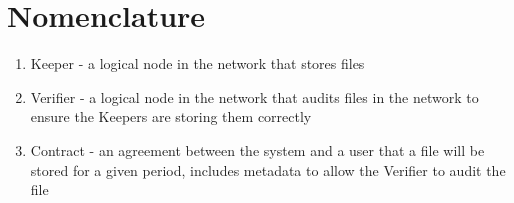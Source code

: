 \chapter{Nomenclature}
\label{chap:nomenclature}

\begin{enumerate}
    \item Keeper - a logical node in the network that stores files
    \item Verifier - a logical node in the network that audits files in the network to ensure the Keepers are storing them correctly
    \item Contract - an agreement between the system and a user that a file will be stored for a given period, includes metadata to allow the Verifier to audit the file
\end{enumerate}
